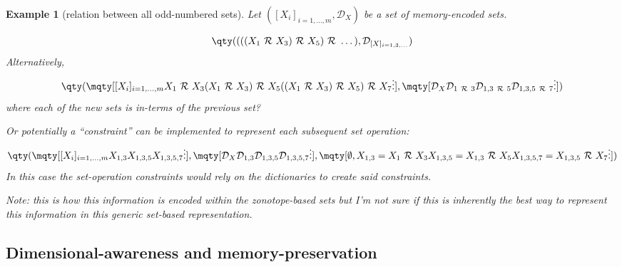 \documentclass[11pt]{article}
\newtheorem{example}{Example}
\newcommand{\Rel}{\ \mathcal{R} \ }
\newcommand{\Dict}{\mathcal{D}} %
\begin{document}
\begin{example}[relation between all odd-numbered sets] \label{ex:rel_odd_sets}
	Let $([X_{i}]_{i=1,\dots,m}, \Dict_{X})$ be a set of memory-encoded sets.
	
	\[
		\qty((((X_{1} \Rel X_{3}) \Rel X_{5}) \Rel \dots), 
			\Dict_{[X]_{i=1,3,\dots}})
	\]
	Alternatively,
	\[
		\qty(\mqty[
			[X_{i}]_{i=1,\dots,m}\\
			X_{1} \Rel X_{3}\\
			(X_{1} \Rel X_{3})\Rel X_5\\
			((X_{1} \Rel X_{3})\Rel X_5) \Rel X_7\\
			\vdots
		],
		\mqty[
			\Dict_{X}\\ \Dict_{1 \Rel 3}\\ \Dict_{1,3 \Rel 5}\\ \Dict_{1,3, 5 \Rel 7}\\
			\vdots
		]
		)
	\]
	where each of the new sets is in-terms of the previous set?

	Or potentially a ``constraint'' can be implemented to represent each subsequent set operation:
	\[
		\qty(
			\mqty[[X_{i}]_{i=1,\dots,m}\\
			X_{1,3}\\
			X_{1,3,5}\\
			X_{1,3,5,7}\\
			\vdots],
		\mqty[
			\Dict_{X}\\ 
			\Dict_{1,3}\\ 
			\Dict_{1,3,5}\\ 
			\Dict_{1,3,5,7}\\
			\vdots
		],
		\mqty[
			\emptyset,\\
			X_{1,3} = X_{1} \Rel X_{3}\\
			X_{1,3,5} = X_{1,3} \Rel X_{5}\\
			X_{1,3,5,7} = X_{1,3,5} \Rel X_{7}\\
			\vdots
		]
		)
	\]
	In this case the set-operation constraints would rely on the dictionaries to create said constraints.

	Note: this is how this information is encoded within the zonotope-based sets but I'm not sure if this is inherently the best way to represent this information in this generic set-based representation.
\end{example}

\subsection{Dimensional-awareness and memory-preservation}
\end{document}
